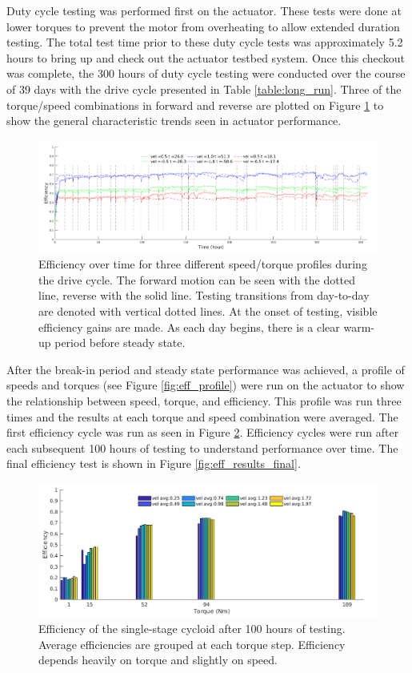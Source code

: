 Duty cycle testing was performed first on the actuator.
These tests were done at lower torques to prevent the motor from overheating to allow extended duration testing.
The total test time prior to these duty cycle tests was approximately 5.2 hours to bring up and check out the actuator testbed system.
Once this checkout was complete, the 300 hours of duty cycle testing were conducted over the course of 39 days with the drive cycle presented in Table \ref{table:long_run}.
Three of the torque/speed combinations in forward and reverse are plotted on Figure \ref{fig:long_run} to show the general characteristic trends seen in actuator performance.

\begin{figure}
   \centering
   \includegraphics[width=\linewidth]{fig/total_runtime}
   \caption{Efficiency over time for three different speed/torque profiles during the drive cycle.
   The forward motion can be seen with the dotted line, reverse with the solid line.
   Testing transitions from day-to-day are denoted with vertical dotted lines.
   At the onset of testing, visible efficiency gains are made.
   As each day begins, there is a clear warm-up period before steady state.
   }
   \label{fig:long_run}
\end{figure}

After the break-in period and steady state performance was achieved, a profile of speeds and torques (see Figure \ref{fig:eff_profile}) were run on the actuator to show the relationship between speed, torque, and efficiency.
This profile was run three times and the results at each torque and speed combination were averaged. The first efficiency cycle was run as seen in Figure \ref{fig:eff_results}. Efficiency cycles were run after each subsequent 100 hours of testing to understand performance over time. The final efficiency test is shown in Figure \ref{fig:eff_results_final}.

\begin{figure}[t]
   \centering
   \includegraphics[width=0.8\linewidth]{fig/eff_test_bar_plot_v3}
   \caption{Efficiency of the single-stage cycloid after 100 hours of testing. Average efficiencies are grouped at each torque step.
   Efficiency depends heavily on torque and slightly on speed.}
   \label{fig:eff_results}
\end{figure}

